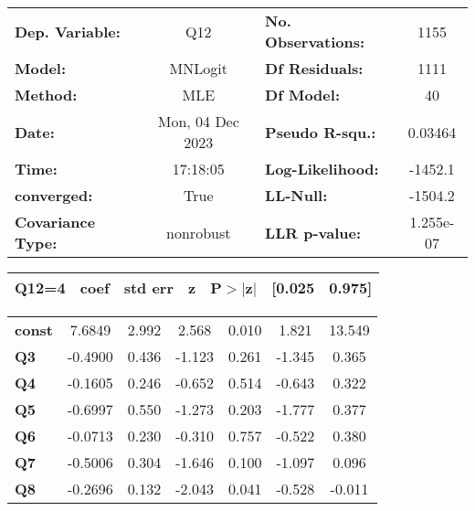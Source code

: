 \begin{center}
\begin{tabular}{lclc}
\toprule
\textbf{Dep. Variable:}   &       Q12        & \textbf{  No. Observations:  } &     1155    \\
\textbf{Model:}           &     MNLogit      & \textbf{  Df Residuals:      } &     1111    \\
\textbf{Method:}          &       MLE        & \textbf{  Df Model:          } &       40    \\
\textbf{Date:}            & Mon, 04 Dec 2023 & \textbf{  Pseudo R-squ.:     } &  0.03464    \\
\textbf{Time:}            &     17:18:05     & \textbf{  Log-Likelihood:    } &   -1452.1   \\
\textbf{converged:}       &       True       & \textbf{  LL-Null:           } &   -1504.2   \\
\textbf{Covariance Type:} &    nonrobust     & \textbf{  LLR p-value:       } & 1.255e-07   \\
\bottomrule
\end{tabular}
\begin{tabular}{ccccccc}
 \textbf{Q12=4}  & \textbf{coef} & \textbf{std err} & \textbf{z} & \textbf{P$> |$z$|$} & \textbf{[0.025} & \textbf{0.975]}  \\
\midrule
\bottomrule
\end{tabular}
\begin{tabular}{lcccccc}
\textbf{const}   &       7.6849  &        2.992     &     2.568  &         0.010        &        1.821    &       13.549     \\
\textbf{Q3}      &      -0.4900  &        0.436     &    -1.123  &         0.261        &       -1.345    &        0.365     \\
\textbf{Q4}      &      -0.1605  &        0.246     &    -0.652  &         0.514        &       -0.643    &        0.322     \\
\textbf{Q5}      &      -0.6997  &        0.550     &    -1.273  &         0.203        &       -1.777    &        0.377     \\
\textbf{Q6}      &      -0.0713  &        0.230     &    -0.310  &         0.757        &       -0.522    &        0.380     \\
\textbf{Q7}      &      -0.5006  &        0.304     &    -1.646  &         0.100        &       -1.097    &        0.096     \\
\textbf{Q8}      &      -0.2696  &        0.132     &    -2.043  &         0.041        &       -0.528    &       -0.011     \\

\end{tabular}
\end{center}
